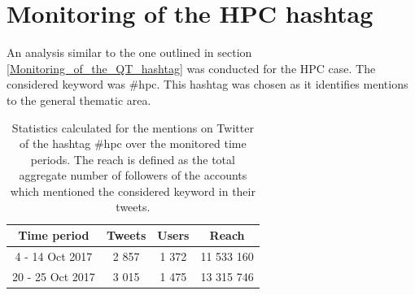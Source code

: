 \section{Monitoring of the HPC hashtag} \label{Monitoring_of_the_HPC_hashtag}
An analysis similar to the one outlined in section \ref{Monitoring_of_the_QT_hashtag} was conducted for the HPC case. The considered keyword was \#hpc. This hashtag was chosen as it identifies mentions to the general thematic area.

\begin{table}[t]
 \begin{center}
  \begin{tabular}{cccc}
   \hline 
   \hline
   Time period & Tweets & Users & Reach \\ 
   \hline
   \hline
   4 - 14 Oct 2017 & 2 857 & 1 372 & 11 533 160  \\
   20 - 25 Oct 2017 & 3 015 & 1 475 & 13 315 746  \\
   \hline
   \hline
  \end{tabular}
 \end{center} 
 \caption{Statistics calculated for the mentions on Twitter of the hashtag \#hpc over the monitored time periods. The reach is defined as the total aggregate number of followers of the accounts which mentioned the considered keyword in their tweets.}
\label{Summary_HPC} 
\end{table}

